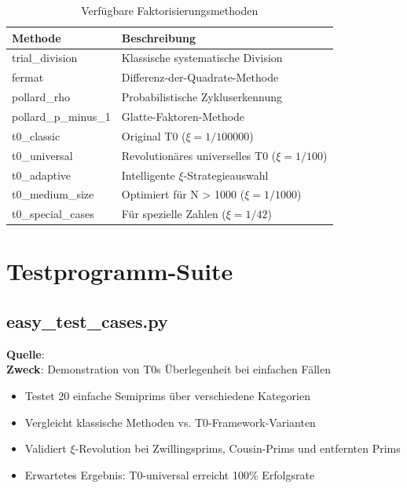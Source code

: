 	\begin{table}[H]
		\centering
		\caption{Verfügbare Faktorisierungsmethoden}
		\begin{tabular}{ll}
			\toprule
			\textbf{Methode} & \textbf{Beschreibung} \\
			\midrule
			trial\_division & Klassische systematische Division \\
			fermat & Differenz-der-Quadrate-Methode \\
			pollard\_rho & Probabilistische Zykluserkennung \\
			pollard\_p\_minus\_1 & Glatte-Faktoren-Methode \\
			t0\_classic & Original T0 ($\xi = 1/100000$) \\
			t0\_universal & Revolutionäres universelles T0 ($\xi = 1/100$) \\
			t0\_adaptive & Intelligente $\xi$-Strategieauswahl \\
			t0\_medium\_size & Optimiert für N > 1000 ($\xi = 1/1000$) \\
			t0\_special\_cases & Für spezielle Zahlen ($\xi = 1/42$) \\
			\bottomrule
		\end{tabular}
	\end{table}
	
	\section{Testprogramm-Suite}
	
	\subsection{easy\_test\_cases.py}
	\textbf{Quelle}: \\
	\textbf{Zweck}: Demonstration von T0s Überlegenheit bei einfachen Fällen
	\begin{itemize}
		\item Testet 20 einfache Semiprims über verschiedene Kategorien
		\item Vergleicht klassische Methoden vs. T0-Framework-Varianten
		\item Validiert $\xi$-Revolution bei Zwillingsprims, Cousin-Prims und entfernten Prims
		\item Erwartetes Ergebnis: T0-universal erreicht 100\% Erfolgsrate
	\end{itemize}
	
